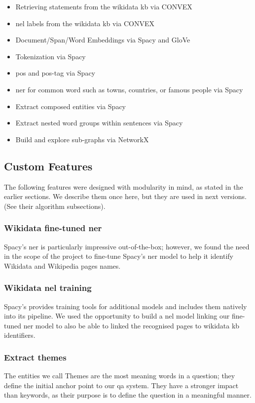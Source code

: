 \begin{itemize}
    \setlength\itemsep{0em}
    \item Retrieving statements from the \gls{wikidata} \gls{kb} via CONVEX
    \item \gls{nel} labels from the \gls{wikidata} \gls{kb} via CONVEX
    \item Document/Span/Word Embeddings via Spacy and GloVe
    \item Tokenization via Spacy
    \item \gls{pos} and \gls{pos-tag} via Spacy
    \item \gls{ner} for common word such as towns, countries, or famous people via Spacy
    \item Extract composed entities via Spacy
    \item Extract nested word groups within sentences via Spacy
    \item Build and explore sub-graphs via NetworkX
\end{itemize}

\subsection{Custom Features}
\label{graphqa:custom1}
The following features were designed with modularity in mind, as stated in the earlier sections. We describe them once here, but they are used in next versions. (See their algorithm subsections).

\subsubsection{Wikidata fine-tuned \gls{ner}}
Spacy's \gls{ner} is particularly impressive out-of-the-box; however, we found the need in the scope of the project to fine-tune Spacy's \gls{ner} model to help it identify Wikidata and Wikipedia pages names.

\subsubsection{Wikidata \gls{nel} training}
Spacy's provides training tools for additional models and includes them natively into its pipeline. We used the opportunity to build a \gls{nel} model linking our fine-tuned \gls{ner} model to also be able to linked the recognised pages to \gls{wikidata} \gls{kb} identifiers.

\subsubsection{Extract themes} 
The entities we call Themes are the most meaning words in a question; they define the initial anchor point to our \gls{qa} system. They have a stronger impact than keywords, as their purpose is to define the question in a meaningful manner.


